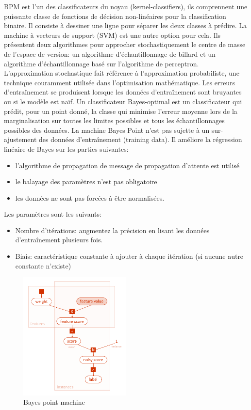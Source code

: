 \documentclass[12pt]{article}
\begin{document}
{BPM est l'un des classificateurs du noyau (kernel-classifiers), ils comprennent une puissante classe de fonctions de décision non-linéaires pour la classification binaire. Il consiste à dessiner une ligne pour séparer les deux classes à prédire. La machine à vecteurs de support (SVM) est une autre option pour cela.
Ils présentent deux algorithmes pour approcher stochastiquement le centre de masse de l'espace de version: un algorithme d'échantillonnage de billard et un algorithme d'échantillonnage basé sur l'algorithme de perceptron. L'approximation stochastique fait référence à l'approximation probabiliste, une technique couramment utilisée dans l'optimisation mathématique. Les erreurs d'entraînement se produisent lorsque les données d'entraînement sont bruyantes ou si le modèle est naïf.
Un classificateur Bayes-optimal est un classificateur qui prédit, pour un point donné, la classe qui minimise l'erreur moyenne lors de la marginalisation sur toutes les limites possibles et tous les échantillonnages possibles des données.
La machine Bayes Point n'est pas sujette à un sur-ajustement des données d'entraînement (training data).
Il améliore la régression linéaire de Bayes sur les parties suivantes:
\begin{itemize}
\item l'algorithme de propagation de message de propagation d'attente est utilisé
\item le balayage des paramètres n'est pas obligatoire
\item les données ne sont pas forcées à être normalisées.
\end{itemize}
Les paramètres sont les suivants:
\begin{itemize}
\item Nombre d'itérations: augmentez la précision en lisant les données d'entraînement plusieurs fois.
\item Biais: caractéristique constante à ajouter à chaque itération (si aucune autre constante n'existe)
\end{itemize}


\begin{figure}[H]
	\centering
    \includegraphics[width=0.5\textwidth]{image12.png}
     \caption{Bayes point machine}
    \label{fig:12}
\end{figure}

}
\end{document}

